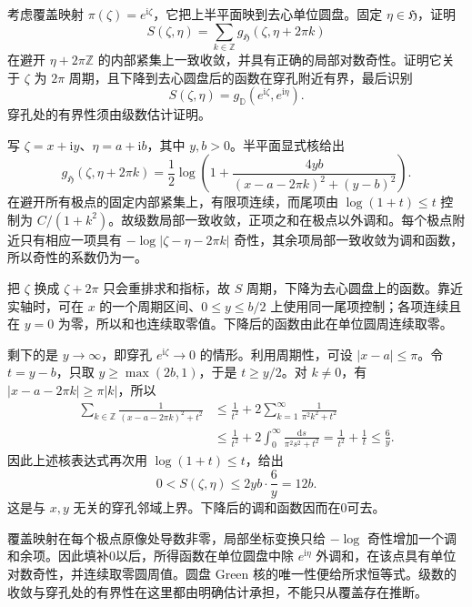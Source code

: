 \begin{exercise}[去心圆盘覆盖上的核求和]\label{b3:ex:17-draft-06}
考虑覆盖映射 \(\pi(\zeta)=e^{\mathrm i\zeta}\)，它把上半平面映到去心单位圆盘。固定 \(\eta\in\mathfrak H\)，证明
\[
 S(\zeta,\eta)=\sum_{k\in\mathbb Z}
                 g_{\mathfrak H}(\zeta,\eta+2\pi k)
\]
在避开 \(\eta+2\pi\mathbb Z\) 的内部紧集上一致收敛，并具有正确的局部对数奇性。证明它关于 \(\zeta\) 为 \(2\pi\) 周期，且下降到去心圆盘后的函数在穿孔附近有界，最后识别
\[
 S(\zeta,\eta)
 =g_{\mathbb D}(e^{\mathrm i\zeta},e^{\mathrm i\eta}).
\]
穿孔处的有界性须由级数估计证明。
\end{exercise}
\begin{solution}
写 \(\zeta=x+\mathrm iy\)、\(\eta=a+\mathrm ib\)，其中 \(y,b>0\)。半平面显式核给出
\[
 g_{\mathfrak H}(\zeta,\eta+2\pi k)
 =\frac12\log\left(1+
    \frac{4yb}{(x-a-2\pi k)^2+(y-b)^2}\right).
\]
在避开所有极点的固定内部紧集上，有限项连续，而尾项由 \(\log(1+t)\le t\) 控制为 \(C/(1+k^2)\)。故级数局部一致收敛，正项之和在极点以外调和。每个极点附近只有相应一项具有 \(-\log|\zeta-\eta-2\pi k|\) 奇性，其余项局部一致收敛为调和函数，所以奇性的系数仍为一。

把 \(\zeta\) 换成 \(\zeta+2\pi\) 只会重排求和指标，故 \(S\) 周期，下降为去心圆盘上的函数。靠近实轴时，可在 \(x\) 的一个周期区间、\(0\le y\le b/2\) 上使用同一尾项控制；各项连续且在 \(y=0\) 为零，所以和也连续取零值。下降后的函数由此在单位圆周连续取零。

剩下的是 \(y\to\infty\)，即穿孔 \(e^{\mathrm i\zeta}\to0\) 的情形。利用周期性，可设 \(|x-a|\le\pi\)。令 \(t=y-b\)，只取 \(y\ge\max(2b,1)\)，于是 \(t\ge y/2\)。对 \(k\ne0\)，有 \(|x-a-2\pi k|\ge\pi|k|\)，所以
\begin{align*}
 \sum_{k\in\mathbb Z}
 \frac1{(x-a-2\pi k)^2+t^2}
 &\le\frac1{t^2}+2\sum_{k=1}^\infty\frac1{\pi^2k^2+t^2}\\
 &\le\frac1{t^2}+2\int_0^\infty\frac{\mathrm ds}{\pi^2s^2+t^2}
 =\frac1{t^2}+\frac1t
 \le\frac6y.
\end{align*}
因此上述核表达式再次用 \(\log(1+t)\le t\)，给出
\[
 0<S(\zeta,\eta)\le2yb\cdot\frac6y=12b.
\]
这是与 \(x,y\) 无关的穿孔邻域上界。下降后的调和函数因而在0可去。

覆盖映射在每个极点原像处导数非零，局部坐标变换只给 \(-\log\) 奇性增加一个调和余项。因此填补0以后，所得函数在单位圆盘中除 \(e^{\mathrm i\eta}\) 外调和，在该点具有单位对数奇性，并连续取零圆周值。圆盘 Green 核的唯一性便给所求恒等式。级数的收敛与穿孔处的有界性在这里都由明确估计承担，不能只从覆盖存在推断。
\end{solution}

